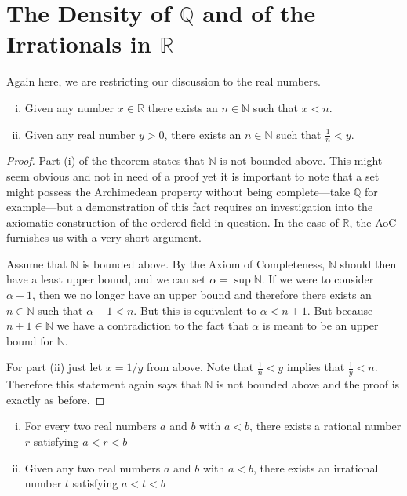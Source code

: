 \section{The Density of \texorpdfstring{$\mathbb{Q}$}{Q} and of the Irrationals in \texorpdfstring{$\mathbb{R}$}{R}}
Again here, we are restricting our discussion to the real numbers.  

\begin{theorem}  \begin{enumerate}[(i)] 
\item  Given any number $x \in \mathbb{R}$ there exists an $n \in \mathbb{N}$ such that $x<n$.  \item Given any real number $y>0$, there exists an $ n \in \mathbb{N}$ such that $\frac{1}{n}< y$. \end{enumerate} \end{theorem}

\begin{proof}   Part (i) of the theorem states that $\mathbb{N}$ is not bounded above.  This might seem obvious and not in need of a proof yet it is important to note that a set might possess the Archimedean property without being complete---take $\mathbb{Q}$ for example---but a demonstration of this fact requires an investigation into the axiomatic construction of the ordered field in question. In the case of $\mathbb{R}$, the AoC furnishes us with a very short argument.

Assume that $\mathbb{N}$ is bounded above.  By the Axiom of Completeness, $\mathbb{N}$ should then have a least upper bound, and we can set $\alpha = \sup \mathbb{N}$.  If we were to consider $\alpha -1$, then we no longer have an upper bound and therefore there exists an $n \in \mathbb{N}$ such that $\alpha - 1 < n$.  But this is equivalent to $\alpha < n+1$. But because $n+1 \in \mathbb{N}$ we have a contradiction to the fact that $\alpha $ is meant to be  an upper bound for $\mathbb{N}$.  

For part (ii) just let $x = 1/y$ from above.
Note that $\frac{1}{n} < y$ implies that $\frac{1}{y} < n$.  Therefore this statement again says that $\mathbb{N}$ is not bounded above and the proof is exactly as before.
\end{proof}

\begin{theorem}    

\begin{enumerate}[(i)] 
\item    For every two real numbers $a$ and $b$ with $a<b$, there exists a rational number $r$ satisfying $a<r<b$
\item Given any two real numbers $a$ and $b$ with $a<b$, there exists an irrational number $t$ satisfying $a<t<b$
 \end{enumerate} \end{theorem}
 
